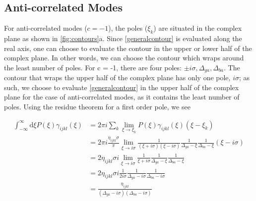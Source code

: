 \documentclass[aip, jcp, reprint, onecolumn, nofootinbib]{revtex4-2}
\begin{document}
\subsection{Anti-correlated Modes}
For anti-correlated modes ($c = -1$), the poles ($\xi_k$) are situated in the complex plane as shown in \autoref{fig:contours}a.
Since \autoref{generalcontour} is evaluated along the real axis, one can choose to evaluate the contour in the upper or lower half of the complex plane.
In other words, we can choose the contour which wraps around the least number of poles.
For c = -1, there are four poles: $\pm i \sigma, \Delta_{ga}, \Delta_{ba}$. 
The contour that wraps the upper half of the complex plane has only one pole, $i \sigma$; as such, we choose to evaluate \autoref{generalcontour} in the upper half of the complex plane for the case of anti-correlated modes, as it contains the least number of poles.
Using the residue theorem for a first order pole,\cite{Carlson1990line} we see
\begin{widetext}
	\begin{equation}
		\begin{split}
			\int_{-\infty}^\infty \mathrm{d}\xi P(\xi) \gamma_{ijkl}(\xi) &= 2\pi i \sum_k \lim_{\xi \rightarrow \xi_k} P(\xi) \gamma_{ijkl}(\xi) (\xi - \xi_k)\\
			&= 2\pi i \frac{\eta_{ijkl} \sigma}{\pi} \lim_{\xi \rightarrow i\sigma} \frac{1}{(\xi + i\sigma)(\xi - i\sigma)} \frac{1}{\Delta_{ga} - \xi} \frac{1}{\Delta_{ba} - \xi} (\xi - i \sigma)\\
			&= 2 \eta_{ijkl} \sigma i \lim_{\xi \rightarrow i\sigma} \frac{1}{\xi + i\sigma} \frac{1}{\Delta_{ga} - \xi} \frac{1}{\Delta_{ba} - \xi}\\
			&= 2\eta_{ijkl} \sigma i \frac{1}{2i\sigma} \frac{1}{\Delta_{ga} - i\sigma} \frac{1}{\Delta_{ba} - i\sigma}\\
			&= \frac{\eta_{ijkl}}{\left(\Delta_{ga}-i\sigma\right)\left(\Delta_{ba}-i \sigma\right)}\\
		\end{split}
	\end{equation}
\end{widetext}
\end{document}
